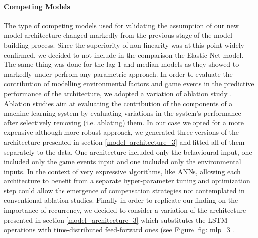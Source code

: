 \paragraph{Competing Models}
\label{competing_models_3}
The type of competing models used for validating the assumption of our new model architecture changed markedly from the previous stage of the model building process. Since the superiority of non-linearity was at this point widely confirmed, we decided to not include in the comparison the Elastic Net model. The same thing was done for the lag-1 and median models as they showed to markedly under-perfrom any parametric approach. In order to evaluate the contribution of modelling environmental factors and game events in the predictive performance of the architecture, we adopted a variation of ablation study \cite{meyes2019ablation}. Ablation studies aim at evaluating the contribution of the components of a machine learning system by evaluating variations in the system's performance after selectively removing (i.e. ablating) them. In our case we opted for a more expensive although more robust approach, we generated three versions of the architecture presented in section \ref{model_architecture_3} and fitted all of them separately to the data. One architecture included only the behavioural input, one included only the game events input and one included only the environmental inputs. In the context of very expressive algorithms, like ANNs, allowing each architecture to benefit from a separate hyper-parameter tuning and optimization step could allow the emergence of compensation strategies not contemplated in conventional ablation studies. Finally in order to replicate our finding on the importance of recurrency, we decided to consider a variation of the architecture presented in section \ref{model_architecture_3} which substitutes the LSTM operations with time-distributed feed-forward ones (see Figure \ref{fig: mlp_3}.


